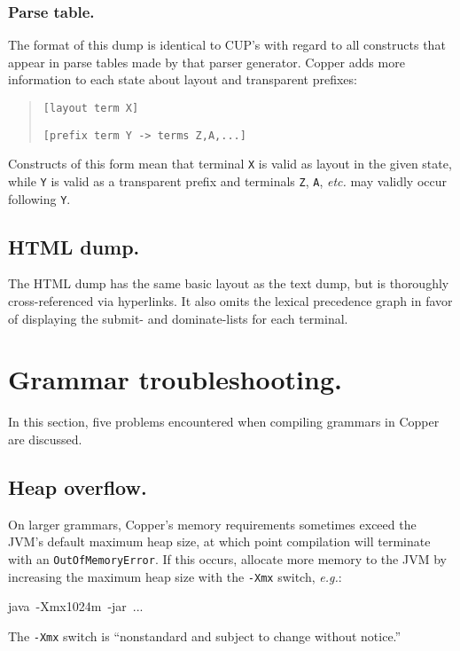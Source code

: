\documentclass[12pt,english,twoside]{report}
\newenvironment{codeblock}
{\begin{list}{}{
\setlength{\rightmargin}{\leftmargin}
\setlength{\listparindent}{0pt}%
\raggedright
\setlength{\itemsep}{0pt}
\setlength{\parsep}{0pt}
\normalfont\ttfamily}%
 \item[]}
{\end{list}}
\begin{document}
\subsubsection{Parse table.}

The format of this dump is identical to CUP's with regard to all constructs
that appear in parse tables made by that parser generator. Copper
adds more information to each state about layout and transparent prefixes:

\begin{quotation}
\texttt{{[}layout term X]}

\texttt{{[}prefix term Y -> terms Z,A,...]}
\end{quotation}
Constructs of this form mean that terminal \texttt{X} is valid as
layout in the given state, while \texttt{Y} is valid as a transparent
prefix and terminals \texttt{Z}, \texttt{A}, \emph{etc.} may validly
occur following \texttt{Y}.

\subsection{HTML dump.}

The HTML dump has the same basic layout as the text dump, but is
thoroughly cross-referenced via hyperlinks. It also omits the lexical
precedence graph in favor of displaying the submit- and dominate-lists
for each terminal.

\section{Grammar troubleshooting.}

In this section, five problems encountered when compiling grammars
in Copper are discussed.

\subsection{Heap overflow.}

On larger grammars, Copper's memory requirements sometimes exceed the
JVM's default maximum heap size, at which point compilation will terminate with an \texttt{OutOfMemoryError}. If this occurs, allocate more memory to the JVM by increasing the maximum heap size with the \texttt{-Xmx} switch, \emph{e.g.}:

\begin{codeblock}
java~-Xmx1024m~-jar~...
\end{codeblock}
The \texttt{-Xmx} switch is {}``nonstandard and subject to change
without notice.''
\end{document}
